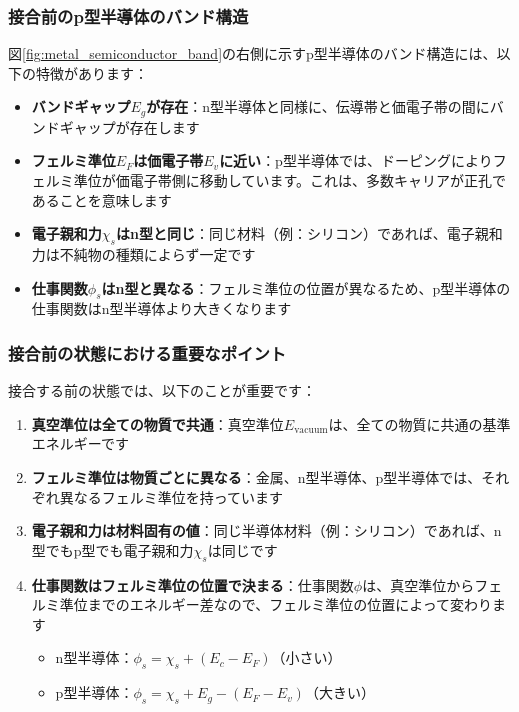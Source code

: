 \subsubsection{接合前のp型半導体のバンド構造}

図\ref{fig:metal_semiconductor_band}の右側に示すp型半導体のバンド構造には、以下の特徴があります：

\begin{itemize}
\item \textbf{バンドギャップ$E_g$が存在}：n型半導体と同様に、伝導帯と価電子帯の間にバンドギャップが存在します

\item \textbf{フェルミ準位$E_F$は価電子帯$E_v$に近い}：p型半導体では、ドーピングによりフェルミ準位が価電子帯側に移動しています。これは、多数キャリアが正孔であることを意味します

\item \textbf{電子親和力$\chi_s$はn型と同じ}：同じ材料（例：シリコン）であれば、電子親和力は不純物の種類によらず一定です

\item \textbf{仕事関数$\phi_s$はn型と異なる}：フェルミ準位の位置が異なるため、p型半導体の仕事関数はn型半導体より大きくなります
\end{itemize}

\subsubsection{接合前の状態における重要なポイント}

接合する前の状態では、以下のことが重要です：

\begin{enumerate}
\item \textbf{真空準位は全ての物質で共通}：真空準位$E_{\text{vacuum}}$は、全ての物質に共通の基準エネルギーです

\item \textbf{フェルミ準位は物質ごとに異なる}：金属、n型半導体、p型半導体では、それぞれ異なるフェルミ準位を持っています

\item \textbf{電子親和力は材料固有の値}：同じ半導体材料（例：シリコン）であれば、n型でもp型でも電子親和力$\chi_s$は同じです

\item \textbf{仕事関数はフェルミ準位の位置で決まる}：仕事関数$\phi$は、真空準位からフェルミ準位までのエネルギー差なので、フェルミ準位の位置によって変わります
\begin{itemize}
\item n型半導体：$\phi_s = \chi_s + (E_c - E_F)$（小さい）
\item p型半導体：$\phi_s = \chi_s + E_g - (E_F - E_v)$（大きい）
\end{itemize}
\end{enumerate}

